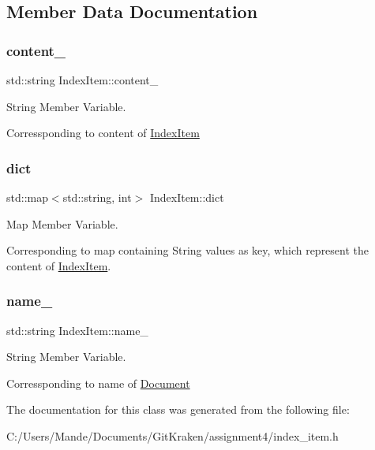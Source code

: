 \subsection{Member Data Documentation}
\mbox{\label{class_index_item_a5d2cd643f9b1749810b4f5ea479925ed}} 
\subsubsection{\texorpdfstring{content\+\_\+}{content\_}}
{\footnotesize\ttfamily std\+::string Index\+Item\+::content\+\_\+\hspace{0.3cm}{\ttfamily [protected]}}



String Member Variable. 

Corressponding to content of \hyperlink{class_index_item}{Index\+Item} \mbox{\label{class_index_item_a819728205ae50085a6bd2456ce8c556b}} 
\subsubsection{\texorpdfstring{dict}{dict}}
{\footnotesize\ttfamily std\+::map$<$std\+::string, int$>$ Index\+Item\+::dict\hspace{0.3cm}{\ttfamily [protected]}}



Map Member Variable. 

Corresponding to map containing String values as key, which represent the content of \hyperlink{class_index_item}{Index\+Item}. \mbox{\label{class_index_item_a803a48d6e32976f6c9c42e83b10f61c5}} 
\subsubsection{\texorpdfstring{name\+\_\+}{name\_}}
{\footnotesize\ttfamily std\+::string Index\+Item\+::name\+\_\+\hspace{0.3cm}{\ttfamily [protected]}}



String Member Variable. 

Corressponding to name of \hyperlink{class_document}{Document} 

The documentation for this class was generated from the following file\+:\begin{DoxyCompactItemize}
\item 
C\+:/\+Users/\+Mande/\+Documents/\+Git\+Kraken/assignment4/index\+\_\+item.\+h\end{DoxyCompactItemize}
